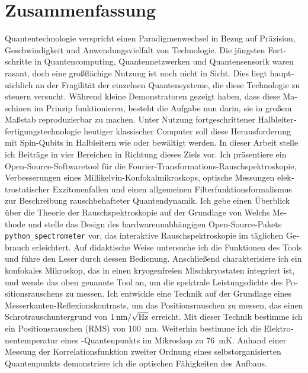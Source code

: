 \documentclass[a4paper,10pt]{article}
\begin{document}
\section*{Zusammenfassung}
\begin{german}
    Quantentechnologie verspricht einen Paradigmenwechsel in Bezug auf Präzision, Geschwindigkeit und Anwendungsvielfalt von Technologie.
    Die jüngsten Fortschritte in Quantencomputing, Quantennetzwerken und Quantensensorik waren rasant, doch eine großflächige Nutzung ist noch nicht in Sicht.
    Dies liegt hauptsächlich an der Fragilität der einzelnen Quantensysteme, die diese Technologie zu steuern versucht.
    Während kleine Demonstratoren gezeigt haben, dass diese Maschinen im Prinzip funktionieren, besteht die Aufgabe nun darin, sie in großem Maßstab reproduzierbar zu machen.
    Unter Nutzung fortgeschrittener Halbleiterfertigungstechnologie heutiger klassischer Computer soll diese Herausforderung mit Spin-Qubits in Halbleitern wie  oder  bewältigt werden.
    In dieser Arbeit stelle ich Beiträge in vier Bereichen in Richtung dieses Ziels vor.
    Ich präsentiere ein Open-Source-Softwaretool für die Fourier-Transformations-Rauschspektroskopie, Verbesserungen eines Millikelvin-Konfokalmikroskops, optische Messungen elektrostatischer Exzitonenfallen und einen allgemeinen Filterfunktionsformalismus zur Beschreibung rauschbehafteter Quantendynamik.
    Ich gebe einen Überblick über die Theorie der Rauschspektroskopie auf der Grundlage von Welchs Methode und stelle das Design des hardwareunabhängigen Open-Source-Pakets \texttt{python\_spectrometer} vor, das interaktive Rauschspektroskopie im täglichen Gebrauch erleichtert.
    Auf didaktische Weise untersuche ich die Funktionen des Tools und führe den Leser durch dessen Bedienung.
    Anschließend charakterisiere ich ein konfokales Mikroskop, das in einen kryogenfreien Mischkryostaten integriert ist, und wende das oben genannte Tool an, um die spektrale Leistungsdichte des Positionsrauschens zu messen.
    Ich entwickle eine Technik auf der Grundlage eines Messerkanten-Reflexionskontrasts, um das Positionsrauschen zu messen, das einen Schrotrauschuntergrund von $\qty{1}{\nano\meter\per\sqrt{\hertz}}$ erreicht.
    Mit dieser Technik bestimme ich ein Positionsrauschen (RMS) von \qty{100}{\nano\meter}.
    Weiterhin bestimme ich die Elektronentemperatur eines -Quantenpunkts im Mikroskop zu \qty{76}{\milli\kelvin}.
    Anhand einer Messung der Korrelationsfunktion zweiter Ordnung eines selbstorganisierten Quantenpunkts demonstriere ich die optischen Fähigkeiten des Aufbaus.

\end{german}
\end{document}
